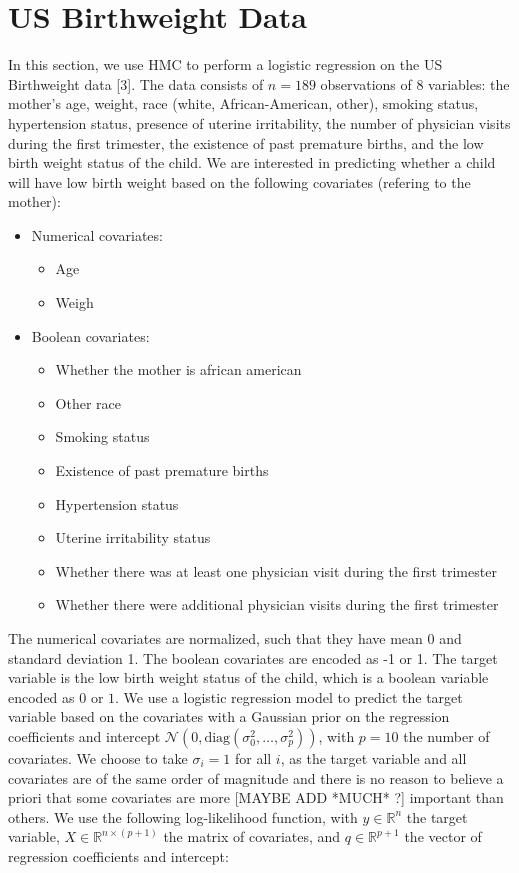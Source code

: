 \documentclass[a4paper, 12pt,oneside]{article}
\begin{document}
	\section{US Birthweight Data}
	In this section, we use HMC to perform a logistic regression on the US Birthweight data [3]. The data consists of $n=189$ observations of 8 variables: the mother's age, weight, race (white, African-American, other), smoking status, hypertension status, presence of uterine irritability, the number of physician visits during the first trimester, the existence of past premature births, and the low birth weight status of the child. We are interested in predicting whether a child will have low birth weight based on the following covariates (refering to the mother):
	\begin{itemize}
		\item Numerical covariates:
		\begin{itemize}
			\item Age
			\item Weigh
		\end{itemize}
		\item Boolean covariates:
		\begin{itemize}
			\item Whether the mother is african american
			\item Other race
			\item Smoking status
			\item Existence of past premature births
			\item Hypertension status
			\item Uterine irritability status
			\item Whether there was at least one physician visit during the first trimester
			\item Whether there were additional physician visits during the first trimester
		\end{itemize}
	\end{itemize}
	The numerical covariates are normalized, such that they have mean 0 and standard deviation 1. The boolean covariates are encoded as -1 or 1. The target variable is the low birth weight status of the child, which is a boolean variable encoded as $0$ or $1$. We use a logistic regression model to predict the target variable based on the covariates with a Gaussian prior on the regression coefficients and intercept $\mathcal{N}(0,\mathrm{diag}(\sigma^2_0, \ldots, \sigma^2_p))$, with $p=10$ the number of covariates. We choose to take $\sigma_i = 1$ for all $i$, as the target variable and all covariates are of the same order of magnitude and there is no reason to believe a priori that some covariates are more [MAYBE ADD *MUCH* ?] important than others. We use the following log-likelihood function, with $y\in \mathbb{R}^{n}$ the target variable, $X\in \mathbb{R}^{n\times (p+1)}$ the matrix of covariates, and $q\in \mathbb{R}^{p+1}$ the vector of regression coefficients and intercept:
\end{document}
